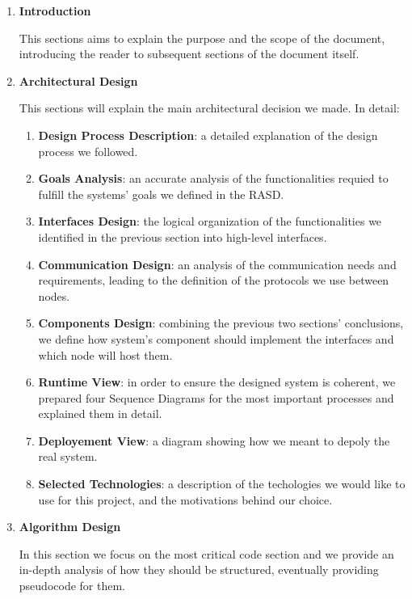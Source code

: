 \documentclass[11pt]{article} %
\begin{document}
\begin{enumerate}
	\item \textbf{Introduction}

	This sections aims to explain the purpose and the scope of the document, introducing the reader to subsequent sections of the document itself.

	\item \textbf{Architectural Design}
	 
	This sections will explain the main architectural decision we made. In detail:

	\begin{enumerate}

		\item \textbf{Design Process Description}: a detailed explanation of the design process we followed.
		\item \textbf{Goals Analysis}: an accurate analysis of the functionalities requied to fulfill the systems' goals we defined in the RASD.
		\item \textbf{Interfaces Design}: the logical organization of the functionalities we identified in the previous section into high-level interfaces.
		\item \textbf{Communication Design}: an analysis of the communication needs and requirements, leading to the definition of the protocols we use between nodes.
		\item \textbf{Components Design}: combining the previous two sections' conclusions, we define how system's component should implement the interfaces and which node will host them.
		\item \textbf{Runtime View}: in order to ensure the designed system is coherent, we prepared four Sequence Diagrams for the most important processes and explained them in detail.
		\item \textbf{Deployement View}: a diagram showing how we meant to depoly the real system.
		\item \textbf{Selected Technologies}: a description of the techologies we would like to use for this project, and the motivations behind our choice.
	
	\end{enumerate}

	\item \textbf{Algorithm Design}

	In this section we focus on the most critical code section and we provide an in-depth analysis of how they should be structured, eventually providing pseudocode for them.
	

\end{enumerate}
\end{document}
